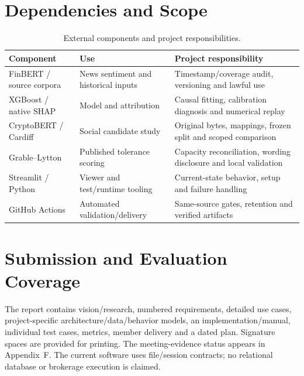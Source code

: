 \section{Dependencies and Scope}
\begin{longtable}{p{}p{}p{}}
\caption{External components and project responsibilities.}\label{tab:dependencies}\\\toprule Component & Use & Project responsibility\\\midrule
FinBERT / source corpora & News sentiment and historical inputs & Timestamp/coverage audit, versioning and lawful use\\
XGBoost / native SHAP & Model and attribution & Causal fitting, calibration diagnosis and numerical replay\\
CryptoBERT / Cardiff & Social candidate study & Original bytes, mappings, frozen split and scoped comparison\\
Grable--Lytton & Published tolerance scoring & Capacity reconciliation, wording disclosure and local validation\\
Streamlit / Python & Viewer and test/runtime tooling & Current-state behavior, setup and failure handling\\
GitHub Actions & Automated validation/delivery & Same-source gates, retention and verified artifacts\\
\bottomrule\end{longtable}
\section{Submission and Evaluation Coverage}
The report contains vision/research, numbered requirements, detailed use cases, project-specific architecture/data/behavior models, an implementation/manual, individual test cases, metrics, member delivery and a dated plan. Signature spaces are provided for printing. The meeting-evidence status appears in Appendix~F. The current software uses file/session contracts; no relational database or brokerage execution is claimed.
